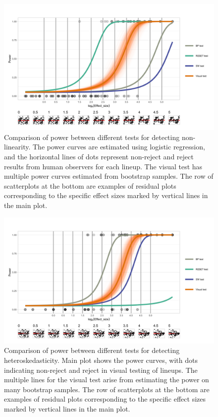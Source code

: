 \documentclass[11pt,a4paper,]{article}
\begin{document}
\begin{figure}
\centering
\includegraphics{polypower-1.png}
\caption{Comparison of power between different tests for detecting non-linearity. The power curves are estimated using logistic regression, and the horizontal lines of dots represent non-reject and reject results from human observers for each lineup. The visual test has multiple power curves estimated from bootstrap samples. The row of scatterplots at the bottom are examples of residual plots corresponding to the specific effect sizes marked by vertical lines in the main plot.\label{fig:polypower}}
\end{figure}

\begin{figure}
\centering
\includegraphics{heterpower-1.png}
\caption{Comparison of power between different tests for detecting heteroskedasticity. Main plot shows the power curves, with dots indicating non-reject and reject in visual testing of lineups. The multiple lines for the visual test arise from estimating the power on many bootstrap samples. The row of scatterplots at the bottom are examples of residual plots corresponding to the specific effect sizes marked by vertical lines in the main plot.\label{fig:heterpower}}
\end{figure}
\end{document}
